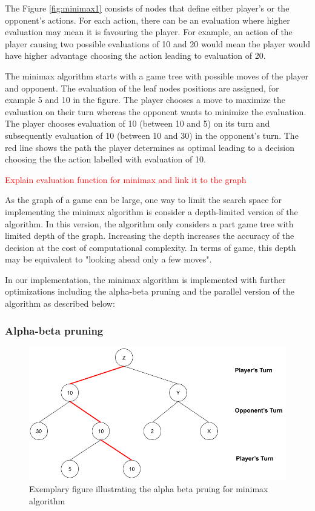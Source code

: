The Figure \ref{fig:minimax1} consists of nodes that define either player's or the opponent's actions. For each action, there can be an evaluation where higher evaluation may mean it is favouring the player. For example, an action of the player causing two possible evaluations of 10 and 20 would mean the player would have higher advantage choosing the action leading to evaluation of 20. 

The minimax algorithm starts with a game tree with possible moves of the player and opponent. The evaluation of the leaf nodes positions are assigned, for example 5 and 10 in the figure. The player chooses a move to maximize the evaluation on their turn whereas the opponent wants to minimize the evaluation. The player chooses evaluation of 10 (between 10 and 5) on its turn and subsequently evaluation of 10 (between 10 and 30) in the opponent's turn. The red line shows the path the player determines as optimal leading to a decision choosing the the action labelled with evaluation of 10.

\textcolor{red}{Explain evaluation function for minimax and link it to the graph}

As the graph of a game can be large, one way to limit the search space for implementing the minimax algorithm is consider a depth-limited version of the algorithm. In this version, the algorithm only considers a part game tree with limited depth of the graph. Increasing the depth increases the accuracy of the decision at the cost of computational complexity. In terms of game, this depth may be equivalent to "looking ahead only a few moves".

In our implementation, the minimax algorithm is implemented with further optimizations including the alpha-beta pruning and the parallel version of the algorithm as described below:

\subsubsection{Alpha-beta pruning}

\begin{figure}[!ht]
    \centering
    \includegraphics[width=\linewidth]{../img/Minimax2.png}
    \caption{Exemplary figure illustrating the alpha beta pruing for minimax algorithm}
    \label{fig:minimax2}
\end{figure}

